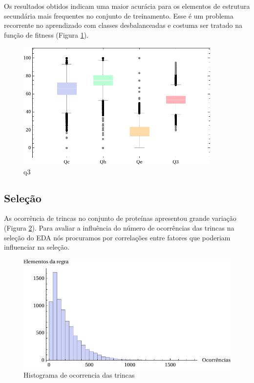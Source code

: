 Os resultados obtidos indicam uma maior acurácia para os elementos de estrutura secundária mais frequentes no conjunto de treinamento. Esse é um problema recorrente no aprendizado com classes desbalanceadas e costuma ser tratado na função de fitness (Figura \ref{fig:q3}). 

\begin{figure}
  \centering
  \includegraphics[width=0.9\textwidth]{figures/q3.pdf}
  \caption{q3}
        \label{fig:q3}
\end{figure}






\subsection{Seleção}

As ocorrência de trincas no conjunto de proteínas apresentou grande variação (Figura \ref{fig:histograma_occ}). Para avaliar a influência do número de ocorrências das trincas na seleção do EDA nós procuramos por correlações entre fatores que poderiam influenciar na seleção.

\begin{figure}
  \centering
  \includegraphics[width=1\textwidth]{figures/histograma_occ.pdf}
  \caption{Histograma de ocorrencia das trincas}
        \label{fig:histograma_occ}
\end{figure}


